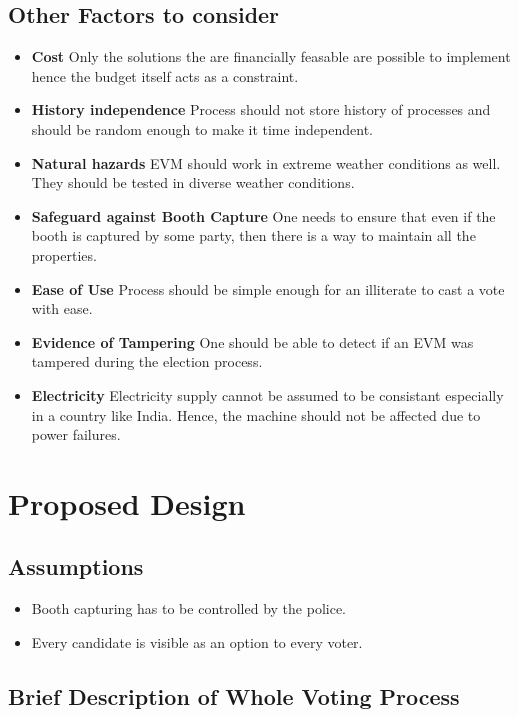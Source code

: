 \documentclass[11pt]{article}
\begin{document}
    \subsection{Other Factors to consider}
    \begin{itemize}
    \item \textbf{Cost} Only the solutions the are financially feasable are possible to implement hence the budget itself acts as a constraint.
    \item \textbf{History independence} Process should not store history of processes and should be random enough to make it time independent.
    \item \textbf{Natural hazards} EVM should work in extreme weather conditions as well. They should be tested in diverse weather conditions.       
    \item \textbf{Safeguard against Booth Capture} One needs to ensure that even if the booth is captured by some party, then there is a way to maintain all the properties.
    \item \textbf{Ease of Use} Process should be simple enough for an illiterate  to cast a vote with ease.
    \item \textbf{Evidence of Tampering} One should be able to detect if an EVM was tampered during the election process.
    \item \textbf{Electricity} Electricity supply cannot be assumed to be consistant especially in a country like India. Hence, the machine should not be affected due to power failures.
    \end{itemize}

    \section{Proposed Design}
    
    \subsection{Assumptions}
    \begin{itemize}
        \item Booth capturing has to be controlled by the police.
        \item Every candidate is visible as an option to every voter.
    \end{itemize}
    
    \subsection{Brief Description of Whole Voting Process}
    
\end{document}
